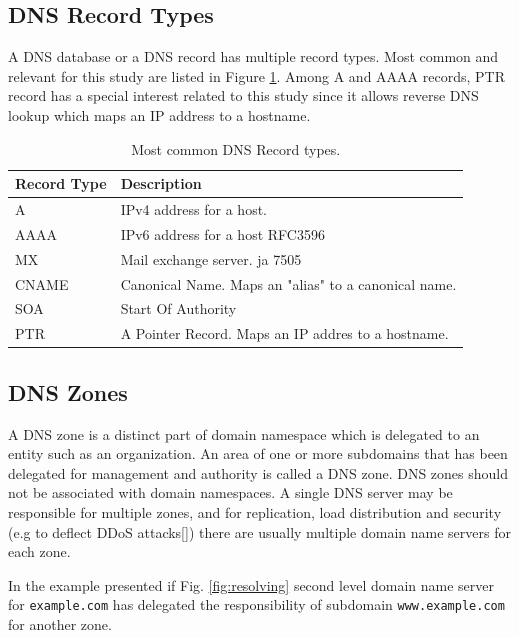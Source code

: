 \subsection{DNS Record Types}

A DNS database or a DNS record has multiple record types. Most common and relevant for this study are listed in Figure \ref{table:dns_record_types}. Among A and AAAA records,  PTR record has a special interest related to this study since it allows reverse DNS lookup which maps an IP address to a hostname.

\begin{table}[th]
\caption{Most common DNS Record types.}
\label{table:dns_record_types}
\begin{center}
\begin{tabular}{|p{}|p{}|} 
    \hline
Record Type & Description \\
    \hline
    \hline
A & IPv4 address for a host. \cite{RFC1035}\\ 
    \hline
AAAA & IPv6 address for a host RFC3596\\
    \hline
MX & Mail exchange server. \cite{RFC1035} ja 7505 \\
    \hline
CNAME & Canonical Name. Maps an "alias" to a canonical name. \cite{RFC1035} \\
    \hline
SOA & Start Of Authority \\    \hline
PTR & A Pointer Record. Maps an IP addres to a hostname. \cite{RFC1035} \\
    \hline
\end{tabular}
\end{center}
\end{table}

\subsection{DNS Zones}
\label{sec:dns_zones}

A DNS zone is a distinct part of domain namespace which is delegated to an entity such as an organization. An area of one or more subdomains that has been delegated for management and authority is called a DNS zone. DNS zones should not be associated with domain namespaces. A single DNS server may be responsible for multiple zones, and for replication, load distribution and security (e.g to deflect DDoS attacks[]) there are usually multiple domain name servers for each zone.\citep{tanenbaum}

In the example presented if Fig. \ref{fig:resolving} second level domain name server for \texttt{example.com} has delegated the responsibility of subdomain \texttt{www.example.com} for another zone.

